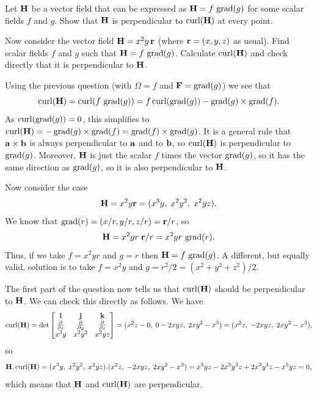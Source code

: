 \documentclass[a4paper]{amsart}
\renewenvironment{solution}{\SolutionInline}{\endSolutionInline}
\begin{document}
\begin{exercise}
 Let $\mathbf{H}$ be a vector field that can be expressed as
 $\mathbf{H}=f\,\operatorname{grad}(g)$ for some scalar fields $f$ and $g$.  Show that
 $\mathbf{H}$ is perpendicular to $\operatorname{curl}(\mathbf{H})$ at every point.


 \medskip

 Now consider the vector field $\mathbf{H}=x^2y\,\mathbf{r}$ (where $\mathbf{r}=(x,y,z)$ as
 usual).  Find scalar fields $f$ and $g$ such that $\mathbf{H}=f\,\operatorname{grad}(g)$.  
 Calculate $\operatorname{curl}(\mathbf{H})$ and check directly that it is perpendicular to
 $\mathbf{H}$.  
\end{exercise}
\begin{solution}
 Using the previous question (with $\Omega=f$ and $\mathbf{F}=\operatorname{grad}(g)$) we
 see that 
 \[ \operatorname{curl}(\mathbf{H}) = \operatorname{curl}(f\,\operatorname{grad}(g))
    = f\operatorname{curl}(\operatorname{grad}(g)) - \operatorname{grad}(g)\times\operatorname{grad}(f).
 \]
 As $\operatorname{curl}(\operatorname{grad}(g))=0$, this simplifies to
 $\operatorname{curl}(\mathbf{H})=-\operatorname{grad}(g)\times\operatorname{grad}(f)=\operatorname{grad}(f)\times\operatorname{grad}(g)$.  It is a
 general rule that $\mathbf{a}\times\mathbf{b}$ is always perpendicular to $\mathbf{a}$ and to
 $\mathbf{b}$, so $\operatorname{curl}(\mathbf{H})$ is perpendicular to $\operatorname{grad}(g)$.  Moreover,
 $\mathbf{H}$ is just the scalar $f$ times the vector $\operatorname{grad}(g)$, so it has
 the same direction as $\operatorname{grad}(g)$, so it is also perpendicular to
 $\mathbf{H}$.  

 Now consider the case 
 \[ \mathbf{H} = x^2y\mathbf{r} = (x^3y,\;x^2y^2,\;x^2yz). \]
 We know that $\operatorname{grad}(r)=(x/r,y/r,z/r)=\mathbf{r}/r$, so 
 \[ \mathbf{H} = x^2yr\;\mathbf{r}/r = x^2yr\,\operatorname{grad}(r). \]
 Thus, if we take $f=x^2yr$ and $g=r$ then $\mathbf{H}=f\,\operatorname{grad}(g)$.  A
 different, but equally valid, solution is to take $f=x^2y$ and
 $g=r^2/2=(x^2+y^2+z^2)/2$.  

 The first part of the question now tells us that $\operatorname{curl}(\mathbf{H})$
 should be perpendicular to $\mathbf{H}$.  We can check this directly as
 follows.  We have
 \[ \operatorname{curl}(\mathbf{H}) = 
     \det\left[\begin{matrix} \mathbf{i} & \mathbf{j} & \mathbf{k} \\ \frac{\partial}{\partial x} & \frac{\partial}{\partial y} & \frac{\partial}{\partial z} \\
      x^3y & x^2y^2 & x^2yz \end{matrix}\right] =
      (x^2z-0,\;0-2xyz,\;2xy^2-x^3) =
       (x^2z,\;-2xyz,\;2xy^2-x^3),
 \]
 so 
 \[ \mathbf{H} . \operatorname{curl}(\mathbf{H}) =
     (x^3y,\;x^2y^2,\;x^2yz) . (x^2z,\;-2xyz,\;2xy^2-x^3) =
     x^5yz-2x^3y^3z+2x^3y^3z-x^5yz = 0,
 \]
 which means that $\mathbf{H}$ and $\operatorname{curl}(\mathbf{H})$ are perpendicular.
\end{solution}
\end{document}
